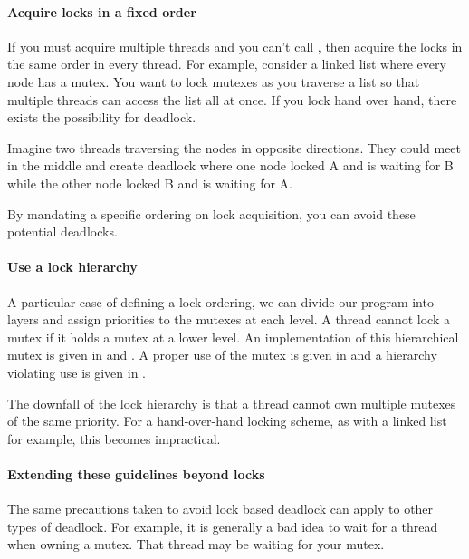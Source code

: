 \paragraph{Acquire locks in a fixed order}
If you must acquire multiple threads and you can't call , then acquire the locks in the same order in every thread. For example, consider a linked list where every node has a mutex. You want to lock mutexes as you traverse a list so that multiple threads can access the list all at once. If you lock hand over hand, there exists the possibility for deadlock.

Imagine two threads traversing the nodes in opposite directions. They could meet in the middle and create deadlock where one node locked A and is waiting for B while the other node locked B and is waiting for A.

By mandating a specific ordering on lock acquisition, you can avoid these potential deadlocks.

\paragraph{Use a lock hierarchy}
A particular case of defining a lock ordering, we can divide our program into layers and assign priorities to the mutexes at each level. A thread cannot lock a mutex if it holds a mutex at a lower level. An implementation of this hierarchical mutex is given in  and . A proper use of the mutex is given in  and a hierarchy violating use is given in .


The downfall of the lock hierarchy is that a thread cannot own multiple mutexes of the same priority. For a hand-over-hand locking scheme, as with a linked list for example, this becomes impractical.

\paragraph{Extending these guidelines beyond locks}
The same precautions taken to avoid lock based deadlock can apply to other types of deadlock. For example, it is generally a bad idea to wait for a thread when owning a mutex. That thread may be waiting for your mutex.

